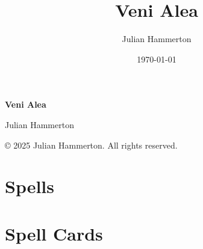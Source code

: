 \documentclass[11pt,a4paper]{article}
\title{Veni Alea}
\author{Julian Hammerton}
\date{\today}
\newcommand{\copyrightline}{\small © 2025 Julian Hammerton. All rights reserved.}
\begin{document}
\begin{titlepage}
  \centering
  {\Huge\bfseries Veni Alea\par}
  \vspace{1cm}
  {\Large Julian Hammerton\par}
  \vfill
  \copyrightline
  \vspace{1cm}
\end{titlepage}


{\hypersetup{linkcolor=black}\tableofcontents}
\newpage


\newpage

\newpage

\newpage


\newpage


\newpage

\newpage

\section{Spells}

\newpage

\section{Spell Cards}

\newpage


\end{document}
